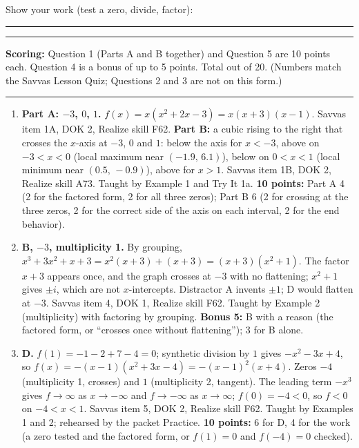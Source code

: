 \documentclass[11pt]{article}
\begin{document}
Show your work (test a zero, divide, factor):

\vspace{12pt}\rule{\textwidth}{0.4pt}

\vspace{10pt}\rule{\textwidth}{0.4pt}

\vspace{2pt}
\noindent\textbf{Scoring:} Question 1 (Parts A and B together) and Question 5 are 10 points each. Question 4 is a bonus of up to 5 points. Total out of 20. {\small (Numbers match the Savvas Lesson Quiz; Questions 2 and 3 are not on this form.)}

\newpage
{}

\vspace{4pt}\noindent\rule{\textwidth}{0.6pt}

\begin{enumerate}
\item \textbf{Part A: $-3$, $0$, $1$.} $f(x)=x(x^2+2x-3)=x(x+3)(x-1)$. Savvas item 1A, DOK 2, Realize skill F62. \textbf{Part B:} a cubic rising to the right that crosses the $x$-axis at $-3$, $0$ and $1$: below the axis for $x<-3$, above on $-3<x<0$ (local maximum near $(-1.9,\,6.1)$), below on $0<x<1$ (local minimum near $(0.5,\,-0.9)$), above for $x>1$. Savvas item 1B, DOK 2, Realize skill A73. Taught by Example 1 and Try It 1a. \textbf{10 points:} Part A 4 (2 for the factored form, 2 for all three zeros); Part B 6 (2 for crossing at the three zeros, 2 for the correct side of the axis on each interval, 2 for the end behavior).
\item[4.] \textbf{B, $-3$, multiplicity 1.} By grouping, $x^3+3x^2+x+3=x^2(x+3)+(x+3)=(x+3)(x^2+1)$. The factor $x+3$ appears once, and the graph crosses at $-3$ with no flattening; $x^2+1$ gives $\pm i$, which are not $x$-intercepts. Distractor A invents $\pm1$; D would flatten at $-3$. Savvas item 4, DOK 1, Realize skill F62. Taught by Example 2 (multiplicity) with factoring by grouping. \textbf{Bonus 5:} B with a reason (the factored form, or ``crosses once without flattening''); 3 for B alone.
\item[5.] \textbf{D.} $f(1)=-1-2+7-4=0$; synthetic division by $1$ gives $-x^2-3x+4$, so $f(x)=-(x-1)(x^2+3x-4)=-(x-1)^2(x+4)$. Zeros $-4$ (multiplicity 1, crosses) and $1$ (multiplicity 2, tangent). The leading term $-x^3$ gives $f\to\infty$ as $x\to-\infty$ and $f\to-\infty$ as $x\to\infty$; $f(0)=-4<0$, so $f<0$ on $-4<x<1$. Savvas item 5, DOK 2, Realize skill F62. Taught by Examples 1 and 2; rehearsed by the packet Practice. \textbf{10 points:} 6 for D, 4 for the work (a zero tested and the factored form, or $f(1)=0$ and $f(-4)=0$ checked).
\end{enumerate}
\end{document}
